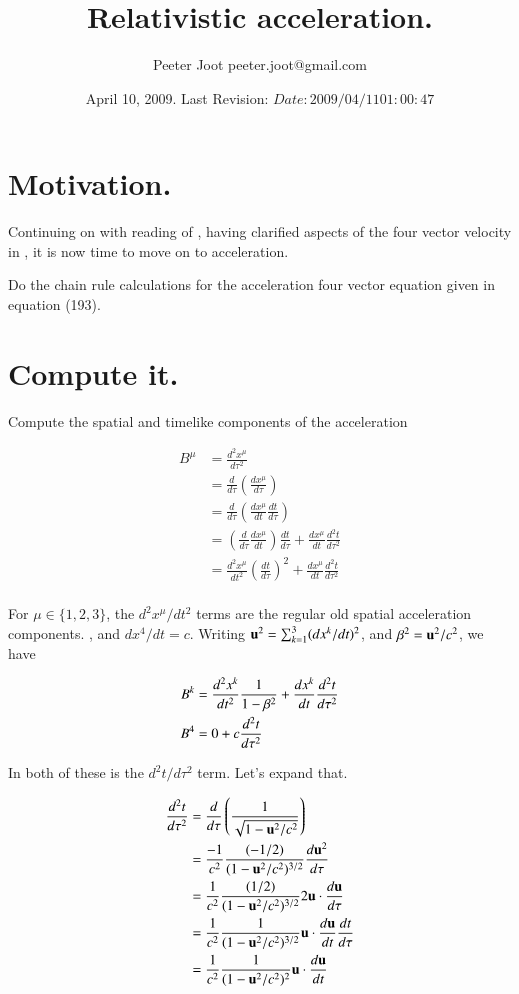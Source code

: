 \documentclass{article}
\title{ Relativistic acceleration. }
\author{Peeter Joot \quad peeter.joot@gmail.com }
\date{ April 10, 2009.  Last Revision: $Date: 2009/04/11 01:00:47 $ }
\begin{document}
\maketitle{}
\tableofcontents
\section{ Motivation. }

Continuing on with reading of \cite{pauli1981tr}, having 
clarified aspects of the four vector velocity in \cite{PJrelativityFourVectorVelocity}, it is now
time to move on to acceleration.

Do the chain rule calculations for the acceleration four vector equation given in equation (193).

\section{ Compute it. }

Compute the spatial and timelike components of the acceleration

\begin{align*}
B^\mu 
&= \frac{d^2 x^\mu}{d\tau^2} \\
&= \frac{d }{d\tau} \left( \frac{d x^\mu }{d\tau} \right) \\
&= \frac{d }{d\tau} \left( \frac{d x^\mu }{dt} \frac{dt}{d\tau} \right) \\
&= \left( \frac{d }{d\tau} \frac{d x^\mu }{dt} \right) \frac{dt}{d\tau} + \frac{d x^\mu }{dt} \frac{d^2t}{d\tau^2} \\
&= \frac{d^2 x^\mu }{dt^2} \left( \frac{dt}{d\tau} \right)^2 + \frac{d x^\mu }{dt} \frac{d^2t}{d\tau^2} \\
\end{align*}

For $\mu \in \{1,2,3\}$, the ${d^2 x^\mu }/{dt^2}$ terms are the regular old spatial acceleration components.
, and $dx^4/dt = c$.  Writing $\mathbf{u}^2 = \sum_{k=1}^3 (dx^k/dt)^2$, and $\beta^2 = \mathbf{u}^2/c^2$, we have

\begin{align*}
B^k &= \frac{d^2 x^k }{dt^2} \frac{1}{1-\beta^2} + \frac{d x^k }{dt} \frac{d^2t}{d\tau^2} \\
B^4 &= 0 + c \frac{d^2t}{d\tau^2} \\
\end{align*}

In both of these is the $d^2t/d\tau^2$ term.  Let's expand that.

\begin{align*}
\frac{d^2t}{d\tau^2} 
&= \frac{d}{d\tau} \left( \frac{1}{\sqrt{ 1 - \mathbf{u}^2/c^2 }} \right) \\
&= \frac{-1}{c^2} \frac{(-1/2) }{({ 1 - \mathbf{u}^2/c^2 })^{3/2}} \frac{d\mathbf{u}^2}{d\tau} \\
&= \frac{1}{c^2} \frac{(1/2) }{({ 1 - \mathbf{u}^2/c^2 })^{3/2}} 2 \mathbf{u} \cdot \frac{d\mathbf{u}}{d\tau} \\
&= \frac{1}{c^2} \frac{1}{({ 1 - \mathbf{u}^2/c^2 })^{3/2}} \mathbf{u} \cdot \frac{d\mathbf{u}}{dt} \frac{dt}{d\tau} \\
&= \frac{1}{c^2} \frac{1}{({ 1 - \mathbf{u}^2/c^2 })^{2}} \mathbf{u} \cdot \frac{d\mathbf{u}}{dt} \\
\end{align*}
\end{document}
